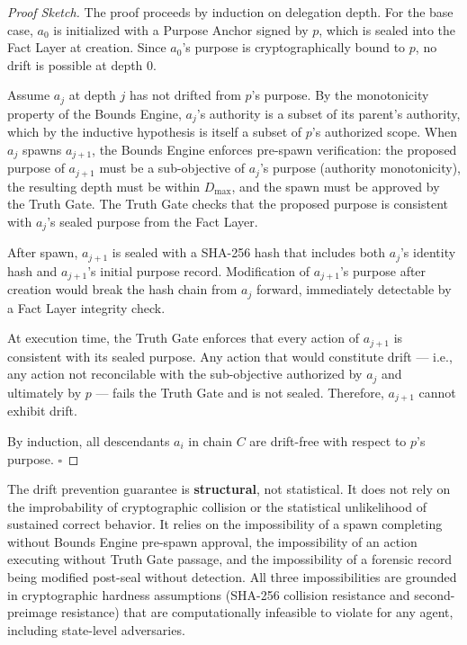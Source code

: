 \begin{proof}[Proof Sketch]
The proof proceeds by induction on delegation depth. For the base case, $a_0$ is initialized with a Purpose Anchor signed by $p$, which is sealed into the Fact Layer at creation. Since $a_0$'s purpose is cryptographically bound to $p$, no drift is possible at depth 0.

Assume $a_j$ at depth $j$ has not drifted from $p$'s purpose. By the monotonicity property of the Bounds Engine, $a_j$'s authority is a subset of its parent's authority, which by the inductive hypothesis is itself a subset of $p$'s authorized scope. When $a_j$ spawns $a_{j+1}$, the Bounds Engine enforces pre-spawn verification: the proposed purpose of $a_{j+1}$ must be a sub-objective of $a_j$'s purpose (authority monotonicity), the resulting depth must be within $D_{\max}$, and the spawn must be approved by the Truth Gate. The Truth Gate checks that the proposed purpose is consistent with $a_j$'s sealed purpose from the Fact Layer.

After spawn, $a_{j+1}$ is sealed with a SHA-256 hash that includes both $a_j$'s identity hash and $a_{j+1}$'s initial purpose record. Modification of $a_{j+1}$'s purpose after creation would break the hash chain from $a_j$ forward, immediately detectable by a Fact Layer integrity check.

At execution time, the Truth Gate enforces that every action of $a_{j+1}$ is consistent with its sealed purpose. Any action that would constitute drift — i.e., any action not reconcilable with the sub-objective authorized by $a_j$ and ultimately by $p$ — fails the Truth Gate and is not sealed. Therefore, $a_{j+1}$ cannot exhibit drift.

By induction, all descendants $a_i$ in chain $C$ are drift-free with respect to $p$'s purpose. $\square$
\end{proof}

The drift prevention guarantee is \textbf{structural}, not statistical. It does not rely on the improbability of cryptographic collision or the statistical unlikelihood of sustained correct behavior. It relies on the impossibility of a spawn completing without Bounds Engine pre-spawn approval, the impossibility of an action executing without Truth Gate passage, and the impossibility of a forensic record being modified post-seal without detection. All three impossibilities are grounded in cryptographic hardness assumptions (SHA-256 collision resistance and second-preimage resistance) that are computationally infeasible to violate for any agent, including state-level adversaries.

